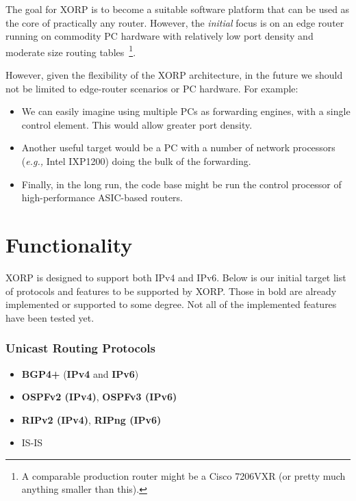 \documentclass[11pt]{article}
\newcommand{\eg}{\emph{e.g.,}\xspace}
\begin{document}
The goal for XORP is to become a suitable software platform that can
be used as the core of practically any router. However, the {\it
initial} focus is on an edge router running on commodity PC hardware
with relatively low port density and moderate size routing
tables~\footnote{A comparable production router might be a Cisco
7206VXR (or pretty much anything smaller than this).}.

However, given the flexibility of the XORP architecture, in the future
we should not be limited to edge-router scenarios or PC hardware.  For
example:
\begin{itemize}

  \item We can easily imagine using multiple PCs as forwarding engines,
  with a single control element. This would allow greater port density.

  \item Another useful target would be a PC with a number of network
  processors (\eg Intel IXP1200) doing the bulk of the forwarding.

  \item Finally, in the long run, the code base might be run the
  control processor of high-performance ASIC-based routers.

\end{itemize}

\section{Functionality}

XORP is designed to support both IPv4 and IPv6.
Below is our initial target list of protocols and features to be
supported by XORP. Those in bold are already implemented or supported
to some degree. Not all of the implemented features have been tested
yet.

\subsubsection*{Unicast Routing Protocols}

\begin{itemize}
  \item {\bf BGP4+} ({\bf IPv4} and {\bf IPv6})
  \item {\bf OSPFv2 (IPv4)}, {\bf OSPFv3 (IPv6)}
  \item {\bf RIPv2 (IPv4)}, {\bf RIPng (IPv6)}
  \item IS-IS
\end{itemize}
\end{document}
